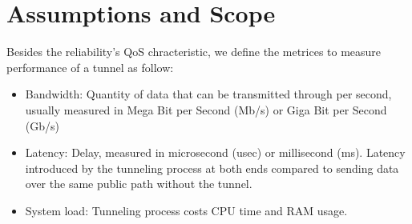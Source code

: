 







\section{Assumptions and Scope}

Besides the reliability's \ac{QoS} chracteristic, we define the metrices to measure performance of a tunnel as follow:
\begin{itemize}
    \item Bandwidth: Quantity of data that can be transmitted through per second, usually measured in Mega Bit per Second (Mb/s) or Giga Bit per Second (Gb/s)
    \item Latency: Delay, measured in microsecond (usec) or millisecond (ms). Latency introduced by the tunneling process at both ends compared to sending data over the same public path without the tunnel.
    \item System load: Tunneling process costs CPU time and RAM usage.
\end{itemize}

